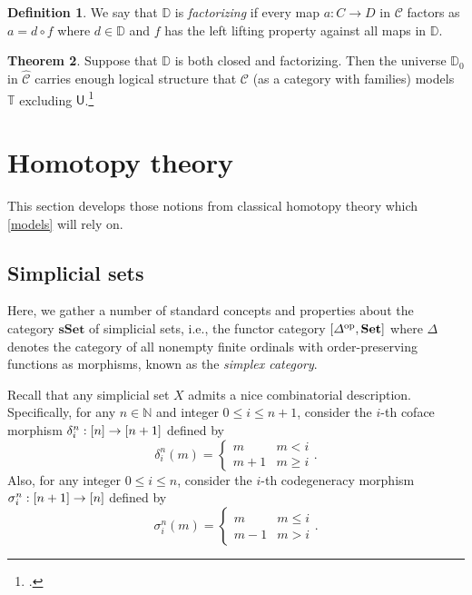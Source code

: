 \documentclass[10pt,letterpaper,cm]{nupset}
\theoremstyle{definition}
\newtheorem{definition}{Definition}[subsection]
\theoremstyle{theorem}
\newtheorem{theorem}[definition]{Theorem}
\theoremstyle{remark}
\newcommand{\U}{\mathsf{U}}
\newcommand{\0}{\mathbf{0}}
\newcommand{\1}{\mathbf{1}}
\newcommand{\2}{\mathbf{2}}
\DeclareMathOperator{\op}{op}
\DeclareMathOperator{\set}{\mathbf{Set}}
\renewcommand{\c}{\mathscr{C}}
\newcommand{\N}{\mathbb N}
\begin{document}
\begin{definition}
We say that $\mathbb{D}$ is \textit{factorizing} if every map $a: C \to D$ in $\c$ factors as $a =d\circ f$ where $d\in \mathbb{D}$ and $f$ has the left lifting property against all maps in $\mathbb{D}$.
\end{definition}

\begin{theorem}\label{Awthm}
Suppose that $\mathbb{D}$ is both closed and factorizing. Then the universe $\mathbb{D}_0$ in $\widehat{\c}$ carries enough logical structure  that $\c$ (as a category with families) models $\mathbb{T}$ excluding $\U$.\footnote{\cite[Theorem 32]{Nat}.}
\end{theorem}

\section{Homotopy theory}\label{htpy}

This section develops those notions from classical homotopy theory which  \cref{models} will rely on.

\subsection{Simplicial sets}

Here, we gather a number of standard concepts and properties about the category $\mathbf{sSet}$ of simplicial sets, i.e., the functor category $\mleft[\varDelta^{\op}, \set\mright]$ where $\varDelta$ denotes the category of all nonempty finite  ordinals with order-preserving functions as morphisms, known as the \textit{simplex category}.

\bigskip

Recall that any simplicial set $X$ admits a nice combinatorial description. Specifically, for any $n\in \N$ and integer $0 \leq i \leq n+1$, consider the $i$-th coface morphism $\delta_i^n: \mleft[n\mright] \to \mleft[n+1\mright]$ defined by 
\[
\delta_i^n(m) = \begin{cases}
m &  m < i
\\ m+1 & m \geq i
\end{cases}.
\]
Also, for any integer $0 \leq i \leq n$, consider the $i$-th codegeneracy morphism $\sigma_i^n: \mleft[n+1\mright] \to \mleft[n\mright]$ defined by
\[
\sigma_i^n(m) = \begin{cases}
m &  m \leq  i
\\ m-1 & m > i
\end{cases}.
\] 
\end{document}

